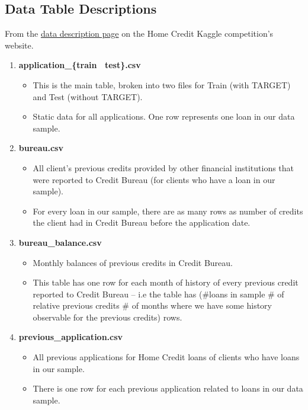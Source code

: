 \documentclass[12pt, letterpaper]{article}
\begin{document}
\begin{appendices}
\section{Data Table Descriptions}
\label{appendix:datatabledescriptions}
From the \href{https://www.kaggle.com/c/home-credit-default-risk/data}{data description page} on the Home Credit Kaggle competition's website\cite{kagglehomecreditcompetitiondata}.
\begin{enumerate}
  \item \textbf{application_\{train \textbar~test\}.csv}
    \begin{itemize}
      \item This is the main table, broken into two files for Train (with TARGET) and Test (without TARGET).
      \item Static data for all applications. One row represents one loan in our data sample.
    \end{itemize}
  \item \textbf{bureau.csv}
    \begin{itemize}
      \item All client's previous credits provided by other financial institutions that were reported to Credit Bureau (for clients who have a loan in our sample).
      \item For every loan in our sample, there are as many rows as number of credits the client had in Credit Bureau before the application date.
    \end{itemize}
  \item \textbf{bureau_balance.csv}
    \begin{itemize}
      \item Monthly balances of previous credits in Credit Bureau.
      \item This table has one row for each month of history of every previous credit reported to Credit Bureau – i.e the table has (\#loans in sample \# of relative previous credits \# of months where we have some history observable for the previous credits) rows.
    \end{itemize}
  \item \textbf{previous_application.csv}
    \begin{itemize}
      \item All previous applications for Home Credit loans of clients who have loans in our sample.
      \item There is one row for each previous application related to loans in our data sample.

\end{itemize}
\end{enumerate}
\end{appendices}
\end{document}
